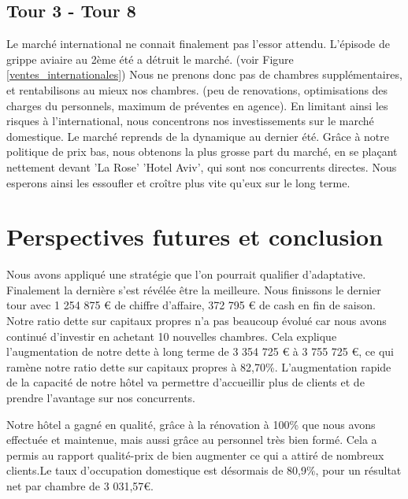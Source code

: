 \documentclass[a4paper,10pt]{article}
\begin{document}
    \subsection{Tour 3 - Tour 8}
      Le marché international ne connait finalement pas l'essor attendu. L'épisode de grippe aviaire au 2ème été a détruit le marché.
      (voir Figure \ref{ventes_internationales})
      Nous ne prenons donc pas de chambres supplémentaires, et rentabilisons au mieux nos chambres. (peu de renovations, optimisations des charges du personnels, maximum de préventes en agence).
      \newline
      En limitant ainsi les risques à l'international, nous concentrons nos investissements sur le marché domestique.
      \newline
      \newline
      Le marché reprends de la dynamique au dernier été. Grâce à notre politique de prix bas, nous obtenons la plus grosse part du marché, en se plaçant nettement devant
      'La Rose' 'Hotel Aviv', qui sont nos concurrents directes. Nous esperons ainsi les essoufler et croître plus vite qu'eux sur le long terme.

  \newpage
  \section{Perspectives futures et conclusion}

  Nous avons appliqué une stratégie que l’on pourrait qualifier d’adaptative.
  Finalement la dernière s’est révélée être la meilleure. Nous finissons le dernier tour
  avec 1 254 875 \euro{} de chiffre d’affaire, 372 795 \euro{} de cash en fin de saison.
  Notre ratio dette sur capitaux propres n’a pas beaucoup évolué car nous avons continué
  d’investir en achetant 10 nouvelles chambres. Cela explique l’augmentation de notre
  dette à long terme de 3 354 725 \euro{} à 3 755 725 \euro{}, ce qui ramène notre ratio
  dette sur capitaux propres à 82,70\%. L’augmentation rapide de la capacité de notre hôtel
  va permettre d’accueillir plus de clients et de prendre l’avantage sur nos concurrents.
  \newline
  \newline
  
  Notre hôtel a gagné en qualité, grâce à la rénovation à 100\%
  que nous avons effectuée et maintenue, mais aussi grâce au personnel
  très bien formé. Cela a permis au rapport qualité-prix de bien augmenter
  ce qui a attiré de nombreux clients.Le taux d’occupation domestique est désormais
  de 80,9\%, pour un résultat net par chambre de 3 031,57\euro{}.
  \newline
  \newline
  
\end{document}
